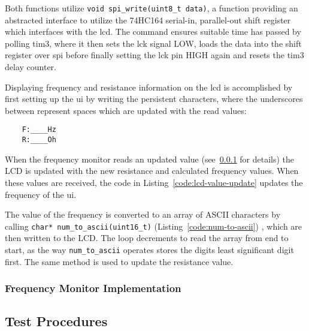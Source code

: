 Both functions utilize \lstinline{void spi_write(uint8_t data)}, a
function providing an abstracted interface to utilize the 74HC164
serial-in, parallel-out shift register which interfaces with the
\gls{lcd}. The command ensures suitable time has passed by polling
\gls{tim3}, where it then sets the \gls{lck} signal LOW, loads the data
into the shift register over \gls{spi} before finally setting the
\gls{lck} pin HIGH again and resets the \gls{tim3} delay counter.

Displaying frequency and resistance information on the \gls{lcd} is
accomplished by first setting up the \gls{ui} by writing the persistent
characters, where the underscores between represent spaces which are
updated with the read values:

\begin{lstlisting}
	F:____Hz
	R:____Oh
\end{lstlisting}

When the frequency monitor reads an updated value (see~\ref{sec:fm-imp}
for details) the LCD is updated with the new resistance and calculated
frequency values. When these values are received, the code in
Listing~\ref{code:lcd-value-update} updates the frequency of the \gls{ui}.


The value of the frequency is converted to an array of ASCII characters
by calling \lstinline{char* num_to_ascii(uint16_t)}
(Listing~\ref{code:num-to-ascii}) , which are then written to the LCD.
The loop decrements to read the array from end to start, as the way
\lstinline{num_to_ascii} operates stores the digits least significant
digit first. The same method is used to update the resistance value.


\subsubsection{Frequency Monitor Implementation} \label{sec:fm-imp}

\subsection{Test Procedures}
